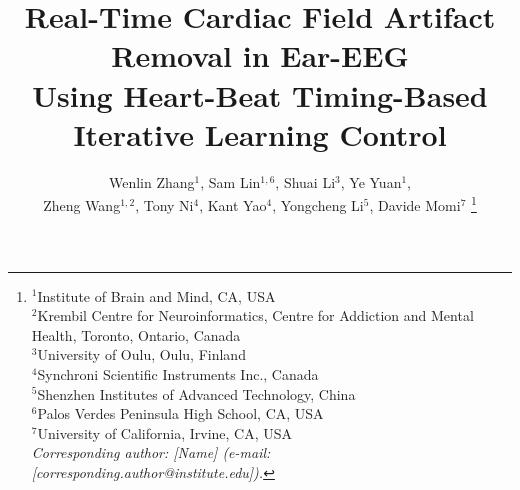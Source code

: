 \documentclass[conference]{IEEEtran}
\begin{document}
\title{Real-Time Cardiac Field Artifact Removal in Ear-EEG\\Using Heart-Beat Timing-Based Iterative Learning Control}

\author{
Wenlin Zhang$^{1}$, Sam Lin$^{1,6}$, Shuai Li$^{3}$, Ye Yuan$^{1}$,\\
Zheng Wang$^{1,2}$, Tony Ni$^{4}$, Kant Yao$^{4}$, Yongcheng Li$^{5}$, Davide Momi$^{7}$%
\thanks{\footnotesize
$^{1}$Institute of Brain and Mind, CA, USA\protect\\
$^{2}$Krembil Centre for Neuroinformatics, Centre for Addiction and Mental Health, Toronto, Ontario, Canada\protect\\
$^{3}$University of Oulu, Oulu, Finland\protect\\
$^{4}$Synchroni Scientific Instruments Inc., Canada\protect\\
$^{5}$Shenzhen Institutes of Advanced Technology, China\protect\\
$^{6}$Palos Verdes Peninsula High School, CA, USA\protect\\
$^{7}$University of California, Irvine, CA, USA\protect\\
\textit{Corresponding author: [Name] (e-mail: [corresponding.author@institute.edu]).}
}
}

\maketitle
\end{document}
